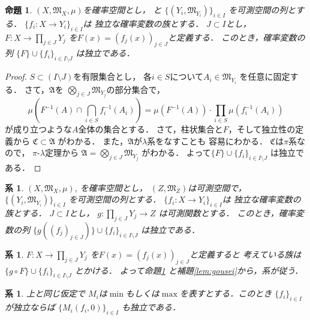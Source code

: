 \documentclass[leqno, a4paper, 12pt]{jsarticle}
\newtheorem{prop}[thm]{命題}
\newtheorem{cor}[thm]{系}
\begin{document}
\begin{prop}\label{prop:prodind}
$(X, \mathfrak{M}_X, \mu)$を確率空間とし，
と
$\{(Y_i, \mathfrak{M}_{Y_i})\}_{i\in I}$
を可測空間の列とする．
$\{f_i: X\to Y_i\}_{i\in I}$は
独立な確率変数の族とする．
$J\subset I$とし，
$F: X\to \prod_{j\in J}Y_{j}$
を$F(x)=(f_{j}(x))_{j\in J}$と定義する．
このとき，確率変数の列
$\{F\}\cup \{f_{i}\}_{i\in I\setminus J}$
は独立である．
\end{prop}
\begin{proof}
$S\subset (I\setminus J)$を有限集合とし，
各$i\in S$について$A_{i}\in \mathfrak{M}_{Y_{i}}$
を任意に固定する．
さて，$\mathfrak{A}$を
$\bigotimes_{j\in J}\mathfrak{M}_{Y_{j}}$の部分集合で，
\[
\mu\left(F^{-1}(A)\cap \bigcap_{i\in S}f_i^{-1}(A_i)\right)=
\mu(F^{-1}(A))\cdot\prod_{i\in S}\mu\left(f_{i}^{-1}(A_i)\right)
\]
が成り立つような$A$全体の集合とする．
さて，柱状集合と$F$，そして独立性の定義から
$\mathfrak{C}\subset \mathfrak{A}$
がわかる．
また，$\mathfrak{A}$が$\lambda$系をなすことも
容易にわかる．
$\mathfrak{C}$は$\pi$系なので，
$\pi$-$\lambda$定理から
$\mathfrak{A}=\bigotimes_{j\in J}\mathfrak{M}_{Y_{j}}$
がわかる．
よって$\{F\}\cup \{f_{i}\}_{i\in I\setminus J}$
は独立である．
\end{proof}

\begin{cor}\label{cor:prodind2}
$(X, \mathfrak{M}_X, \mu)$, 
を確率空間とし，
$(Z, \mathfrak{M}_{Z})$は可測空間で，
$\{(Y_i, \mathfrak{M}_{Y_i})\}_{i\in I}$
を可測空間の列とする．
$\{f_i: X\to Y_i\}_{i\in I}$は
独立な確率変数の族とする．
$J\subset I$とし，
$g:  \prod_{j\in J}Y_{j}\to Z$
は可測関数とする．
このとき，確率変数の列
$\{g((f_{j})_{j\in J})\}\cup \{f_{i}\}_{i\in I\setminus J}$
は独立である．

\end{cor}
\begin{cor}
$F: X\to \prod_{j\in J}Y_{j}$
を$F(x)=(f_{j}(x))_{j\in J}$と定義すると
考えている族は
$\{g\circ F\}\cup \{f_{i}\}_{i\in I\setminus J}$
とかける．
よって命題\ref{prop:prodind}
と補題\ref{lem:gousei}から，系が従う．
\end{cor}

\begin{cor}\label{cor:minmax}
上と同じ仮定で
$M_i$は$\min$もしくは$\max$を表すとする．このとき
$\{f_i\}_{i\in I}$
が独立ならば
$\{M_i(f_i, 0)\}_{i\in I}$
も独立である．
\end{cor}
\end{document}
